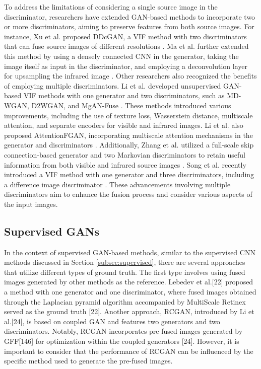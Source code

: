 To address the limitations of considering a single source image in the discriminator, researchers have extended GAN-based methods to incorporate two or more discriminators, aiming to preserve features from both source images. For instance, Xu et al. proposed DDcGAN, a VIF method with two discriminators that can fuse source images of different resolutions \cite{xu2019learning}. Ma et al. further extended this method by using a densely connected CNN in the generator, taking the image itself as input in the discriminator, and employing a deconvolution layer for upsampling the infrared image \cite{ma2020ddcgan}. Other researchers also recognized the benefits of employing multiple discriminators. Li et al. developed unsupervised GAN-based VIF methods with one generator and two discriminators, such as MD-WGAN, D2WGAN, and MgAN-Fuse \cite{li2019infrared, li2020infrared, li2020multigrained}. These methods introduced various improvements, including the use of texture loss, Wasserstein distance, multiscale attention, and separate encoders for visible and infrared images. Li et al. also proposed AttentionFGAN, incorporating multiscale attention mechanisms in the generator and discriminators \cite{li2020attentionfgan}. Additionally, Zhang et al. utilized a full-scale skip connection-based generator and two Markovian discriminators to retain useful information from both visible and infrared source images \cite{zhang2021gan}. Song et al. recently introduced a VIF method with one generator and three discriminators, including a difference image discriminator \cite{song2022triple}. These advancements involving multiple discriminators aim to enhance the fusion process and consider various aspects of the input images.

\subsection{Supervised GANs}

In the context of supervised GAN-based methods, similar to the supervised CNN methods discussed in Section \ref{subsec:supervised}, there are several approaches that utilize different types of ground truth. The first type involves using fused images generated by other methods as the reference. Lebedev et al.[22] proposed a method with one generator and one discriminator, where fused images obtained through the Laplacian pyramid algorithm accompanied by MultiScale Retinex served as the ground truth [22]. Another approach, RCGAN, introduced by Li et al.[24], is based on coupled GAN and features two generators and two discriminators. Notably, RCGAN incorporates pre-fused images generated by GFF[146] for optimization within the coupled generators [24]. However, it is important to consider that the performance of RCGAN can be influenced by the specific method used to generate the pre-fused images.

